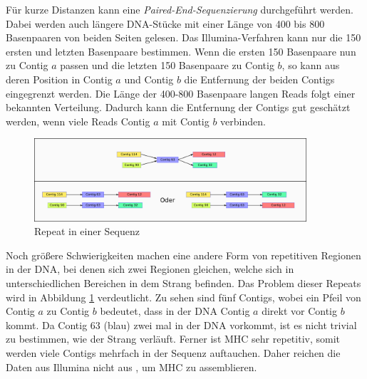 Für kurze Distanzen kann eine 
\emph{Paired-End-Sequenzierung} \cite{berka2009paired} durchgeführt werden.
Dabei werden auch längere DNA-Stücke mit einer Länge von 400 bis 800 Basenpaaren von beiden Seiten gelesen. Das Illumina-Verfahren kann nur die 150 ersten und letzten Basenpaare bestimmen. Wenn die ersten 150 Basenpaare nun zu Contig $a$ passen und die letzten 150 Basenpaare zu Contig $b$, so kann aus deren Position in Contig $a$ und Contig $b$ die Entfernung der beiden Contigs eingegrenzt werden. Die Länge der 400-800 Basenpaare langen Reads folgt einer bekannten Verteilung. Dadurch kann die Entfernung der Contigs gut geschätzt werden, wenn viele Reads Contig $a$ mit Contig $b$ verbinden.


\begin{figure}
\begin{center}
\includegraphics[width=0.9\textwidth]{bilder/repeat}
\end{center}
\caption{Repeat in einer Sequenz}
\label{repeat}
\end{figure}



Noch größere Schwierigkeiten machen eine andere Form von repetitiven Regionen in der DNA, bei denen sich zwei Regionen gleichen, welche 
sich in unterschiedlichen Bereichen in dem Strang befinden. Das Problem dieser Repeats wird in Abbildung \ref{repeat} verdeutlicht. 
Zu sehen sind fünf Contigs, wobei ein Pfeil von Contig $a$ zu Contig $b$ bedeutet, dass in der DNA Contig $a$ direkt vor Contig $b$ kommt. Da Contig 63 (blau) zwei mal in der DNA vorkommt, ist es nicht trivial zu bestimmen, wie der Strang verläuft. 
Ferner ist MHC sehr repetitiv, somit werden viele Contigs mehrfach in der Sequenz auftauchen. Daher reichen die Daten aus Illumina nicht aus
, um MHC zu assemblieren.


